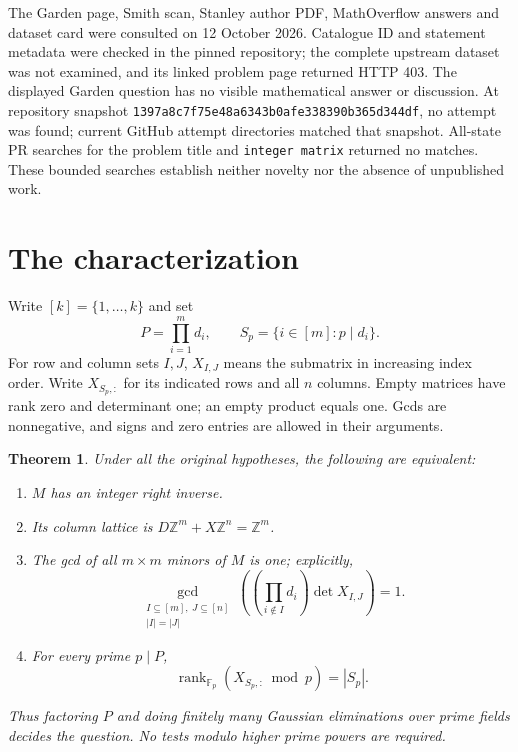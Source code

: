 \documentclass[11pt]{article}
\newtheorem{theorem}{Theorem}
\DeclareMathOperator{\rank}{rank}
\newcommand{\Z}{\mathbb Z}
\newcommand{\F}{\mathbb F}
\begin{document}
The Garden page, Smith scan, Stanley author PDF, MathOverflow answers
and dataset card were consulted on 12 October 2026. Catalogue ID and
statement metadata were checked in the pinned repository; the complete
upstream dataset was not examined, and its linked problem page returned
HTTP 403. The displayed
Garden question has no visible mathematical answer or discussion.
At repository snapshot
\texttt{1397a8c7f75e48a6343b0afe338390b365d344df}, no attempt
was found; current GitHub attempt directories matched that snapshot.
All-state PR searches for the problem title and
\texttt{integer matrix} returned no matches. These bounded searches
establish neither novelty nor the absence of unpublished work.

\section{The characterization}
Write $[k]=\{1,\ldots,k\}$ and set
\[
 P=\prod_{i=1}^m d_i,
 \qquad S_p=\{i\in[m]:p\mid d_i\}.
\]
For row and column sets $I,J$, $X_{I,J}$ means the submatrix in
increasing index order. Write $X_{S_p,:}$ for its indicated rows and
all $n$ columns. Empty matrices have rank zero and determinant one;
an empty product equals one. Gcds are nonnegative, and signs and zero
entries are allowed in their arguments.

\begin{theorem}\label{thm:criterion}
Under all the original hypotheses, the following are equivalent:
\begin{enumerate}
\item $M$ has an integer right inverse.
\item Its column lattice is $D\Z^m+X\Z^n=\Z^m$.
\item The gcd of all $m\times m$ minors of $M$ is one; explicitly,
\begin{equation}\label{eq:weighted}
 \gcd_{\substack{I\subseteq[m],\ J\subseteq[n]\\|I|=|J|}}
 \left(\left(\prod_{i\notin I}d_i\right)\det X_{I,J}\right)=1.
\end{equation}
\item For every prime $p\mid P$,
\begin{equation}\label{eq:local}
 \rank_{\F_p}(X_{S_p,:}\bmod p)=|S_p|.
\end{equation}
\end{enumerate}
Thus factoring $P$ and doing finitely many Gaussian eliminations over
prime fields decides the question. No tests modulo higher prime powers
are required.
\end{theorem}
\end{document}
